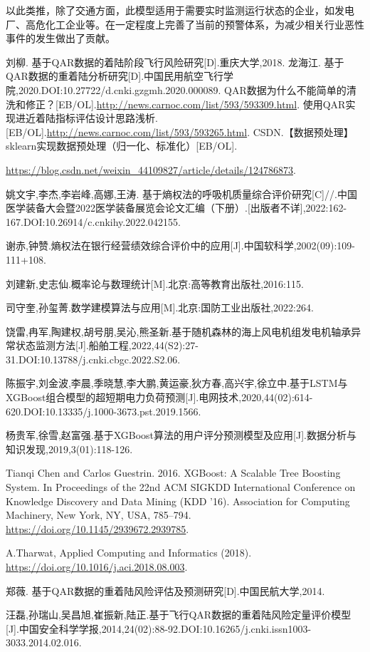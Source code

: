 \documentclass{MathorCupModeling}
\begin{document}
	以此类推，除了交通方面，此模型适用于需要实时监测运行状态的企业，如发电厂、高危化工企业等。在一定程度上完善了当前的预警体系，为减少相关行业恶性事件的发生做出了贡献。
	
	\newpage
	\begin{spacing}{1.08}
	\begin{thebibliography}{99}
	刘柳. 基于QAR数据的着陆阶段飞行风险研究[D].重庆大学,2018.
	龙海江. 基于QAR数据的重着陆分析研究[D].中国民用航空飞行学院,2020.DOI:10.27722/d.cnki.gzgmh.2020.000089.
	QAR数据为什么不能简单的清洗和修正？[EB/OL].\url{http://news.carnoc.com/list/593/593309.html}.
	使用QAR实现进近着陆指标评估设计思路浅析.[EB/OL].\url{http://news.carnoc.com/list/593/593265.html}.
	CSDN.【数据预处理】sklearn实现数据预处理（归一化、标准化）[EB/OL].
	
	\url{https://blog.csdn.net/weixin_44109827/article/details/124786873}.

	姚文宇,李杰,李岩峰,高娜,王涛. 基于熵权法的呼吸机质量综合评价研究[C]//.中国医学装备大会暨2022医学装备展览会论文汇编（下册）.[出版者不详],2022:162-167.DOI:10.26914/c.cnkihy.2022.042155.

	谢赤,钟赞.熵权法在银行经营绩效综合评价中的应用[J].中国软科学,2002(09):109-111+108.

	刘建新,史志仙.概率论与数理统计[M].北京:高等教育出版社,2016:115.

	司守奎,孙玺菁.数学建模算法与应用[M].北京:国防工业出版社,2022:264.

	饶雷,冉军,陶建权,胡号朋,吴沁,熊圣新.基于随机森林的海上风电机组发电机轴承异常状态监测方法[J].船舶工程,2022,44(S2):27-31.DOI:10.13788/j.cnki.cbgc.2022.S2.06.

	陈振宇,刘金波,李晨,季晓慧,李大鹏,黄运豪,狄方春,高兴宇,徐立中.基于LSTM与XGBoost组合模型的超短期电力负荷预测[J].电网技术,2020,44(02):614-620.DOI:10.13335/j.1000-3673.pst.2019.1566.

	杨贵军,徐雪,赵富强.基于XGBoost算法的用户评分预测模型及应用[J].数据分析与知识发现,2019,3(01):118-126.

	Tianqi Chen and Carlos Guestrin. 2016. XGBoost: A Scalable Tree Boosting System. In Proceedings of the 22nd ACM SIGKDD International Conference on Knowledge Discovery and Data Mining (KDD '16). Association for Computing Machinery, New York, NY, USA, 785–794. \url{https://doi.org/10.1145/2939672.2939785}.

	A.Tharwat, Applied Computing and Informatics (2018). \url{https://doi.org/10.1016/j.aci.2018.08.003}.

	郑薇. 基于QAR数据的重着陆风险评估及预测研究[D].中国民航大学,2014.

	汪磊,孙瑞山,吴昌旭,崔振新,陆正.基于飞行QAR数据的重着陆风险定量评价模型[J].中国安全科学学报,2014,24(02):88-92.DOI:10.16265/j.cnki.issn1003-3033.2014.02.016.
	\end{thebibliography}
	\end{spacing}
\end{document}

